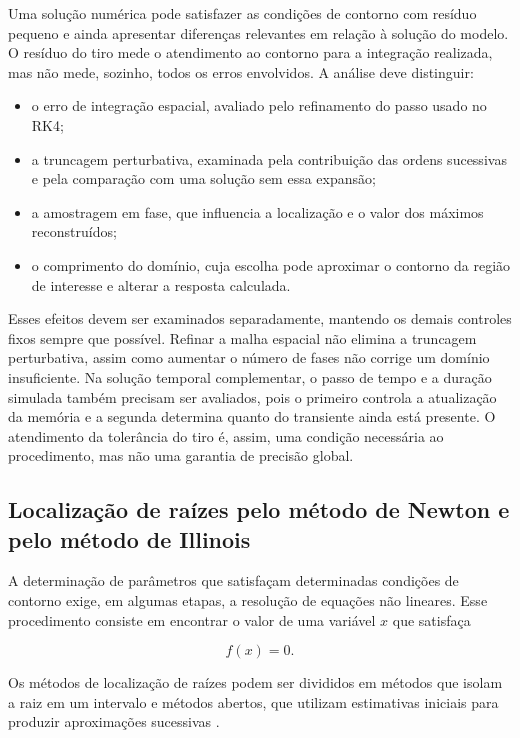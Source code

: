 \documentclass[arial,centeredequations,english,brazilian,oneside,section=TITLE]{ifes8}
\begin{document}
Uma solução numérica pode satisfazer as condições de contorno com resíduo pequeno
e ainda apresentar diferenças relevantes em relação à solução do modelo. O resíduo
do tiro mede o atendimento ao contorno para a integração realizada, mas não mede,
sozinho, todos os erros envolvidos. A análise deve distinguir:

\begin{itemize}
  \item o erro de integração espacial, avaliado pelo refinamento do passo usado no RK4;
  \item a truncagem perturbativa, examinada pela contribuição das ordens sucessivas
  e pela comparação com uma solução sem essa expansão;
  \item a amostragem em fase, que influencia a localização e o valor dos máximos
  reconstruídos;
  \item o comprimento do domínio, cuja escolha pode aproximar o contorno da região
  de interesse e alterar a resposta calculada.
\end{itemize}

Esses efeitos devem ser examinados separadamente, mantendo os demais controles fixos
sempre que possível. Refinar a malha espacial não elimina a truncagem perturbativa,
assim como aumentar o número de fases não corrige um domínio insuficiente.
Na solução temporal complementar, o passo de tempo e a duração simulada também
precisam ser avaliados, pois o primeiro controla a atualização da memória e a segunda
determina quanto do transiente ainda está presente. O atendimento da tolerância do
tiro é, assim, uma condição necessária ao procedimento, mas não uma garantia de
precisão global.

\subsection{Localização de raízes pelo método de Newton e pelo
método de Illinois}
\label{subsec:busca-raizes}

A determinação de parâmetros que satisfaçam determinadas condições
de contorno exige, em algumas etapas, a resolução de equações não
lineares. Esse procedimento consiste em encontrar o valor de uma
variável $x$ que satisfaça

\begin{equation}
  f(x)=0.
  \label{eq:equacao-raiz}
\end{equation}

Os métodos de localização de raízes podem ser divididos em métodos que isolam a raiz
em um intervalo e métodos abertos, que utilizam estimativas
iniciais para produzir aproximações sucessivas \cite{Chapra2011}.
\end{document}
